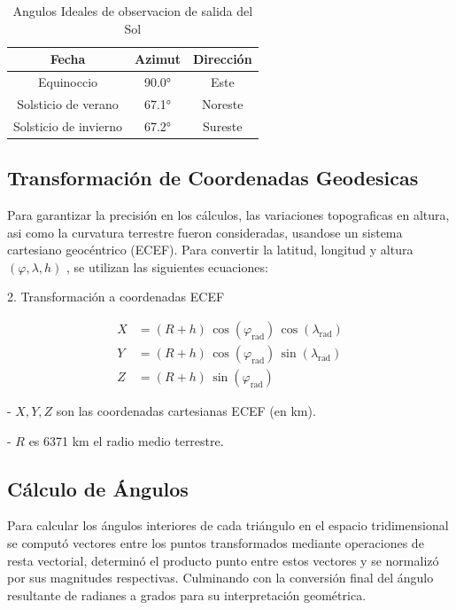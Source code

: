 \documentclass[a4paper,alpha-refs]{eSpectra}
\begin{document}
\begin{table}[h!]
\centering
\begin{tabular}{|c|c|c|}
\hline
\textbf{Fecha} & \textbf{Azimut}  & \textbf{Dirección} \\ \hline
Equinoccio & 90.0° & Este \\ \hline
Solsticio de verano & 67.1° & Noreste \\ \hline
Solsticio de invierno & 67.2° & Sureste \\ \hline
\end{tabular}
\caption{Angulos Ideales de observacion de salida del Sol}
\end{table}

\vspace{-\baselineskip}  %
\vspace{-1\baselineskip}  %

\subsection{Transformación de Coordenadas Geodesicas}
Para garantizar la precisión en los cálculos, las variaciones topograficas en altura, asi como la curvatura terrestre fueron consideradas, usandose un sistema cartesiano geocéntrico (ECEF). Para convertir la latitud, longitud y altura   \((\varphi, \lambda, h)\) , se utilizan las siguientes ecuaciones:

2. Transformación a coordenadas ECEF

\[
\begin{aligned}
X &= (R + h) \, \cos(\varphi_{\text{rad}}) \, \cos(\lambda_{\text{rad}}) \\
Y &= (R + h) \, \cos(\varphi_{\text{rad}}) \, \sin(\lambda_{\text{rad}}) \\
Z &= (R + h) \, \sin(\varphi_{\text{rad}})
\end{aligned}
\]

- \(X, Y, Z\) son las coordenadas cartesianas ECEF (en km).

- \(R\) es 6371 km el radio medio terrestre.



\subsection{Cálculo de Ángulos}
Para calcular los ángulos interiores de cada triángulo en el espacio tridimensional se computó vectores entre los puntos transformados mediante operaciones de resta vectorial, determinó el producto punto entre estos vectores y se normalizó por sus magnitudes respectivas.  Culminando con la conversión final del ángulo resultante de radianes a grados para su interpretación geométrica.
\end{document}
